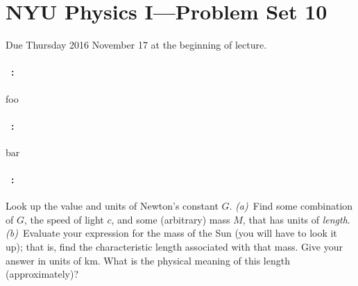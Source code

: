 \documentclass[12pt]{article}
\begin{document}
\section*{NYU Physics I---Problem Set 10}

Due Thursday 2016 November 17 at the beginning of lecture.

\paragraph{\problemname~\theproblem:}%
foo

\paragraph{\problemname~\theproblem:}%
bar

\paragraph{\problemname~\theproblem:}%
Look up the value and units of Newton's constant $G$.
\textsl{(a)}~Find some combination of $G$, the speed of light $c$, and
some (arbitrary) mass $M$, that has units of \emph{length}.
\textsl{(b)}~Evaluate your expression for the mass of the Sun (you
will have to look it up); that is, find the characteristic length
associated with that mass.  Give your answer in units of km.  What is
the physical meaning of this length (approximately)?
\end{document}
